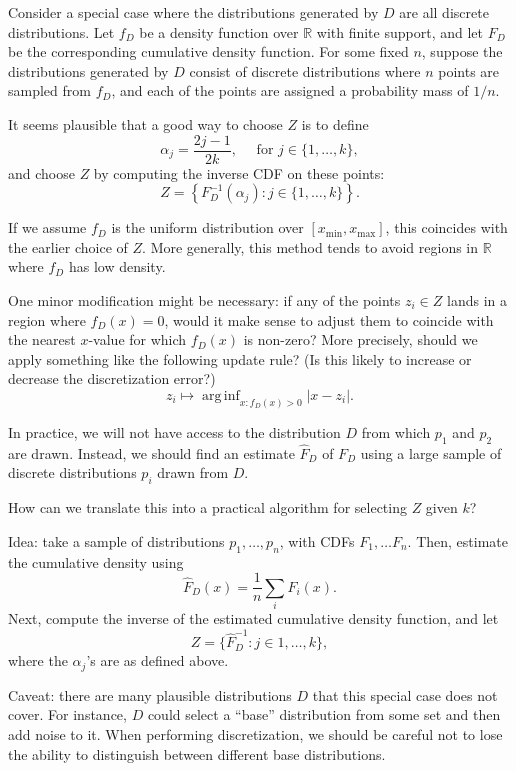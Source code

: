 \documentclass[11pt]{article}
\newcommand{\arginf}{\mathop{\mathrm{arg\,inf}}}
\newcommand{\abs}[1]{\left\lvert#1\right\rvert}
\newcommand{\xmin}{x_\mathrm{min}}
\newcommand{\xmax}{x_\mathrm{max}}
\theoremstyle{definition}
\begin{document}
Consider a special case where the distributions generated by $D$ are all discrete distributions.  Let $f_D$ be a density function over $\mathbb R$ with finite support, and let $F_D$ be the corresponding cumulative density function.  For some fixed $n$, suppose the distributions generated by $D$ consist of discrete distributions where $n$ points are sampled from $f_D$, and each of the points are assigned a probability mass of $1/n$.

It seems plausible that a good way to choose $Z$ is to define
\[ \alpha_j = \frac{2j-1}{2k}, \quad \text{ for } j \in \{1, \ldots, k \}, \]
and choose $Z$ by computing the inverse CDF on these points:
\[ Z = \left\{ F_D^{-1}(\alpha_j) : j \in \{ 1, \ldots, k \} \right\}. \]

If we assume $f_D$ is the uniform distribution over $[\xmin, \xmax]$, this coincides with the earlier choice of $Z$.  More generally, this method tends to avoid regions in $\mathbb R$ where $f_D$ has low density.

One minor modification might be necessary: if any of the points $z_i \in Z$ lands in a region where $f_D(x) = 0$, would it make sense to adjust them to coincide with the nearest $x$-value for which $f_D(x)$ is non-zero?  More precisely, should we apply something like the following update rule?  (Is this likely to increase or decrease the discretization error?)
\[ z_i \mapsto \arginf_{x : f_D(x) > 0} \abs{x-z_i}. \]

In practice, we will not have access to the distribution $D$ from which $p_1$ and $p_2$ are drawn.  Instead, we should find an estimate $\hat F_D$ of $F_D$ using a large sample of discrete distributions $p_i$ drawn from $D$.

How can we translate this into a practical algorithm for selecting $Z$ given $k$?

Idea: take a sample of distributions $p_1, \ldots, p_n$, with CDFs $F_1, \ldots F_n$.  Then, estimate the cumulative density using
\[ \hat F_D(x) = \frac1n \sum_i F_i(x). \]
Next, compute the inverse of the estimated cumulative density function, and let 
\[Z = \{ \hat F_D^{-1}: j \in 1, \ldots, k\},\]
where the $\alpha_j$'s are as defined above.

Caveat: there are many plausible distributions $D$ that this special case does not cover.  For instance, $D$ could select a ``base'' distribution from some set and then add noise to it.  When performing discretization, we should be careful not to lose the ability to distinguish between different base distributions.
\end{document}
